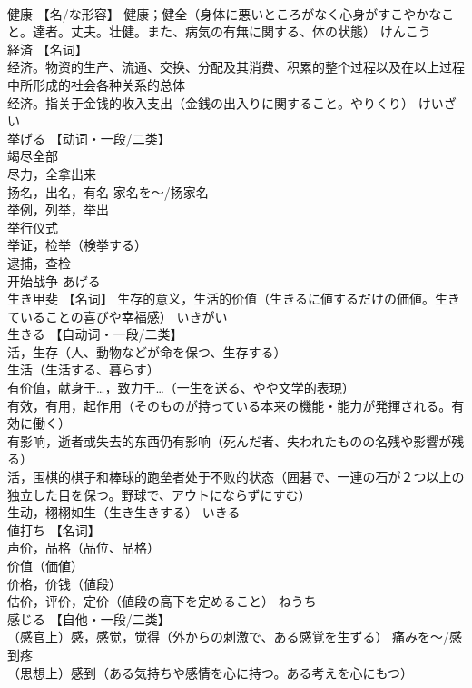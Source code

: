\documentclass[8pt]{extreport}
\begin{document}
\begin{CJK}{UTF8}{min}
\\	健康	【名/な形容】 健康；健全（身体に悪いところがなく心身がすこやかなこと。達者。丈夫。壮健。また、病気の有無に関する、体の状態）	けんこう	
\\	経済	【名词】 
\\	经济。物资的生产、流通、交换、分配及其消费、积累的整个过程以及在以上过程中所形成的社会各种关系的总体 
\\	经济。指关于金钱的收入支出（金銭の出入りに関すること。やりくり）	けいざい	
\\	挙げる	【动词・一段/二类】 
\\	竭尽全部 
\\	尽力，全拿出来 
\\	扬名，出名，有名 家名を～/扬家名 
\\	举例，列举，举出 
\\	举行仪式 
\\	举证，检举（検挙する） 
\\	逮捕，查检 
\\	开始战争	あげる	
\\	生き甲斐	【名词】 生存的意义，生活的价值（生きるに値するだけの価値。生きていることの喜びや幸福感）	いきがい	
\\	生きる	【自动词・一段/二类】 
\\	活，生存（人、動物などが命を保つ、生存する） 
\\	生活（生活する、暮らす） 
\\	有价值，献身于…，致力于…（一生を送る、やや文学的表現） 
\\	有效，有用，起作用（そのものが持っている本来の機能・能力が発揮される。有効に働く） 
\\	有影响，逝者或失去的东西仍有影响（死んだ者、失われたものの名残や影響が残る） 
\\	活，围棋的棋子和棒球的跑垒者处于不败的状态（囲碁で、一連の石が２つ以上の独立した目を保つ。野球で、アウトにならずにすむ） 
\\	生动，栩栩如生（生き生きする）	いきる	
\\	値打ち	【名词】 
\\	声价，品格（品位、品格） 
\\	价值（価値） 
\\	价格，价钱（値段） 
\\	估价，评价，定价（値段の高下を定めること）	ねうち	
\\	感じる	【自他・一段/二类】 
\\	（感官上）感，感觉，觉得（外からの刺激で、ある感覚を生ずる） 痛みを～/感到疼 
\\	（思想上）感到（ある気持ちや感情を心に持つ。ある考えを心にもつ） 

\end{CJK}
\end{document}

